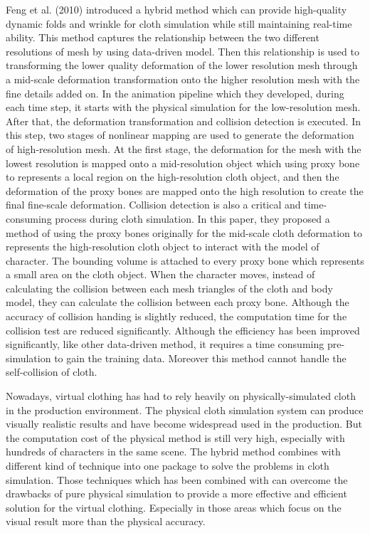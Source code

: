 Feng et al. (2010) introduced a hybrid method which can provide high-quality dynamic folds and wrinkle for cloth simulation while still maintaining real-time ability. This method captures the relationship between the two different resolutions of mesh by using data-driven model. Then this relationship is used to transforming the lower quality deformation of the lower resolution mesh through a mid-scale deformation transformation onto the higher resolution mesh with the fine details added on. In the animation pipeline which they developed, during each time step, it starts with the physical simulation for the low-resolution mesh. After that, the deformation transformation and collision detection is executed. In this step, two stages of nonlinear mapping are used to generate the deformation of high-resolution mesh. At the first stage, the deformation for the mesh with the lowest resolution is mapped onto a mid-resolution object which using proxy bone to represents a local region on the high-resolution cloth object, and then the deformation of the proxy bones are mapped onto the high resolution to create the final fine-scale deformation.   Collision detection is also a critical and time-consuming process during cloth simulation. In this paper, they proposed a method of using the proxy bones originally for the mid-scale cloth deformation to represents the high-resolution cloth object to interact with the model of character. The bounding volume is attached to every proxy bone which represents a small area on the cloth object. When the character moves, instead of calculating the collision between each mesh triangles of the cloth and body model, they can calculate the collision between each proxy bone. Although the accuracy of collision handing is slightly reduced, the computation time for the collision test are reduced significantly. Although the efficiency has been improved significantly, like other data-driven method, it requires a time consuming pre-simulation to gain the training data. Moreover this method cannot handle the self-collision of cloth.

Nowadays, virtual clothing has had to rely heavily on physically-simulated cloth in the production environment. The physical cloth simulation system can produce visually realistic results and have become widespread used in the production. But the computation cost of the physical method is still very high, especially with hundreds of characters in the same scene.  The hybrid method combines with different kind of technique into one package to solve the problems in cloth simulation. Those techniques which has been combined with can overcome the drawbacks of pure physical simulation to provide a more effective and efficient solution for the virtual clothing. Especially in those areas which focus on the visual result more than the physical accuracy.    


